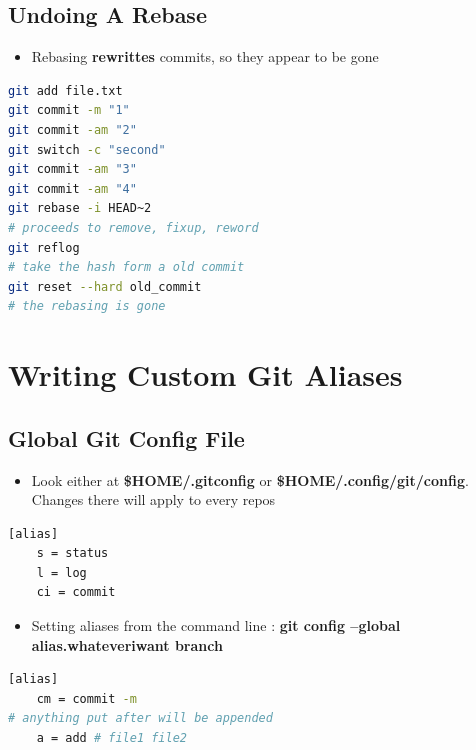 \documentclass{report}
\begin{document}
\section{Undoing A Rebase}

\begin{itemize}
	\item Rebasing \textbf{rewrittes} commits, so they appear to be gone
\end{itemize}

\begin{tcolorbox}[title=Example Of Undoing Rebase,colback=backcolour]
\begin{lstlisting}[language=bash]
git add file.txt
git commit -m "1"
git commit -am "2"
git switch -c "second"
git commit -am "3"
git commit -am "4"
git rebase -i HEAD~2
# proceeds to remove, fixup, reword
git reflog
# take the hash form a old commit
git reset --hard old_commit
# the rebasing is gone
\end{lstlisting}
\end{tcolorbox}


\chapter{Writing Custom Git Aliases}

\section{Global Git Config File}

\begin{itemize}
	\item Look either at \textbf{\$HOME/.gitconfig} or \textbf{\$HOME/.config/git/config}. Changes there will apply to every repos 
\end{itemize}

\begin{tcolorbox}[title=Adding Git Alias,colback=backcolour]
\begin{lstlisting}[language=bash]
[alias]
	s = status
	l = log
	ci = commit
\end{lstlisting}
\end{tcolorbox}

\begin{itemize}
	\item Setting aliases from the command line : \textbf{git config --global alias.whateveriwant branch} 
\end{itemize}

\begin{tcolorbox}[title=Aliases With Arguments,colback=backcolour]
\begin{lstlisting}[language=bash]
[alias]
	cm = commit -m
# anything put after will be appended
	a = add # file1 file2
\end{lstlisting}
\end{tcolorbox}
\end{document}
